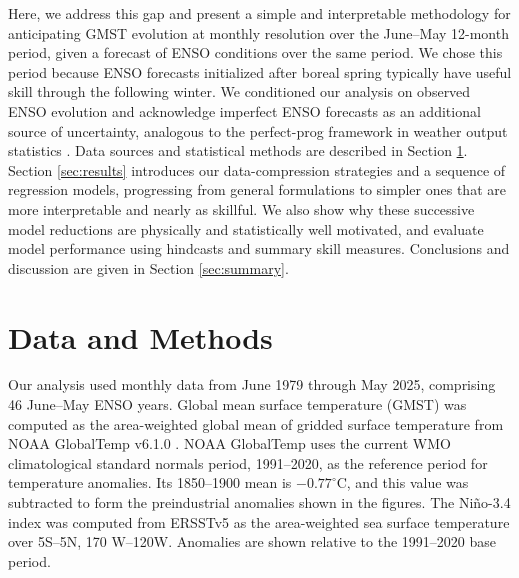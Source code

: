 \documentclass[draft]{agujournal2019}
\begin{document}
Here, we address this gap and present a simple and
    interpretable methodology for anticipating GMST evolution at
    monthly resolution over the June--May 12-month period, given a
    forecast of ENSO conditions over the same period.  We chose this
    period because ENSO forecasts initialized after boreal spring
    typically have useful skill through the following winter. We conditioned our analysis on observed ENSO evolution and
    acknowledge imperfect ENSO forecasts as an additional source of
    uncertainty, analogous to the perfect-prog framework in weather
    output statistics \cite{Glahn72,Klein1959objective}. Data sources and statistical methods are described in Section
    \ref{sec:data-methods}.  Section \ref{sec:results} introduces our
    data-compression strategies and a sequence of regression models,
    progressing from general formulations to simpler ones that are
    more interpretable and nearly as skillful. We also show why these
    successive model reductions are physically and statistically well
    motivated, and evaluate model performance using hindcasts and
    summary skill measures. Conclusions and discussion are given in
    Section \ref{sec:summary}.

\section{Data and Methods}\label{sec:data-methods}

Our analysis used monthly data from June 1979 through May
    2025, comprising 46 June--May ENSO years. Global mean surface temperature (GMST) was computed as the
    area-weighted global mean of gridded surface temperature from NOAA
    GlobalTemp v6.1.0 \cite{Huang2022improvements}. NOAA GlobalTemp
    uses the current WMO climatological standard normals period,
    1991--2020, as the reference period for temperature anomalies. Its
    1850--1900 mean is $-0.77^\circ$C, and this value was subtracted
    to form the preindustrial anomalies shown in the figures. The Niño-3.4 index was computed from ERSSTv5
    \cite{Huang:ERSST5} as the area-weighted sea surface temperature
    over 5\textdegree S--5\textdegree N, 170\textdegree
    W--120\textdegree W.  Anomalies are shown relative to the
    1991--2020 base period.
\end{document}
